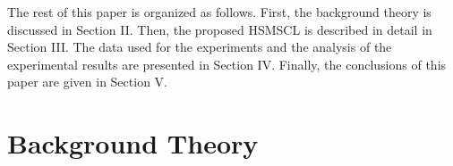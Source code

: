 \documentclass[lettersize,journal]{IEEEtran}
\begin{document}
 The rest of this paper is organized as follows. First, the background theory is discussed in Section II. Then, the proposed HSMSCL is described in detail in Section III. The data used for the experiments and the analysis of the experimental results are presented in Section IV. Finally, the conclusions of this paper are given in Section V.

\section{Background Theory}
\end{document}
